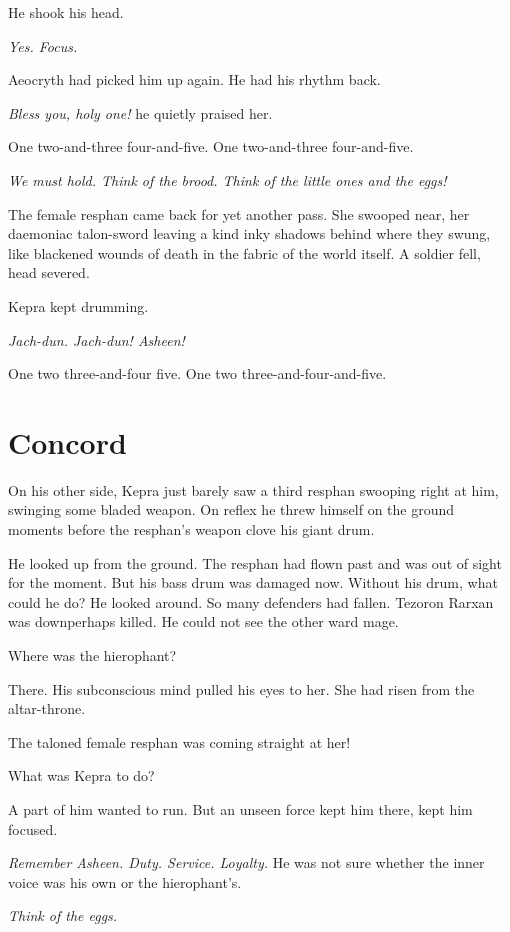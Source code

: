 \documentclass
  [a4paper,
   12pt,
   oneside
  ]%
  {article}
\newcommand{\drum}[1]{\textsf{#1}}
\begin{document}
He shook his head. 

\emph{Yes. Focus.} 

Aeocryth had picked him up again. He had his rhythm back. 

\emph{Bless you, holy one!} he quietly praised her.

\drum{One two-and-three four-and-five. One two-and-three four-and-five.}

\emph{We must hold. Think of the brood. Think of the little ones and the eggs!}

The female resphan came back for yet another pass. She swooped near, her daemoniac talon-sword leaving a kind inky shadows behind where they swung, like blackened wounds of death in the fabric of the world itself. 
A soldier fell, head severed. 

Kepra kept drumming. 

\emph{Jach-dun. Jach-dun! Asheen!}

\drum{One two three-and-four five. One two three-and-four-and-five.}



\section{Concord}
On his other side, Kepra just barely saw a third resphan swooping right at him, swinging some bladed weapon. On reflex he threw himself on the ground moments before the resphan's weapon clove his giant drum. 

He looked up from the ground. 
The resphan had flown past and was out of sight for the moment. 
But his bass drum was damaged now.
Without his drum, what could he do? 
He looked around. So many defenders had fallen. Tezoron Rarxan was down\dash{}perhaps killed. He could not see the other ward mage. 

Where was the hierophant? 

There.
His subconscious mind pulled his eyes to her. She had risen from the altar-throne.

The taloned female resphan was coming straight at her! 

What was Kepra to do? 

A part of him wanted to run. But an unseen force kept him there, kept him focused.

\emph{Remember Asheen. Duty. Service. Loyalty.} 
He was not sure whether the inner voice was his own or the hierophant's.

\emph{Think of the eggs.} 
\end{document}
